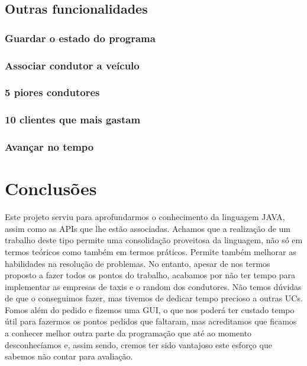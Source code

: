 \documentclass[a4paper]{article}
\begin{document}
\subsection{Outras funcionalidades}
\subsubsection{Guardar o estado do programa}
\subsubsection{Associar condutor a veículo}
\subsubsection{5 piores condutores}
\subsubsection{10 clientes que mais gastam}
\subsubsection{Avançar no tempo}


\section{Conclusões}
\label{sec:conclusao}
Este projeto serviu para aprofundarmos o conhecimento da linguagem JAVA, assim como as APIs que lhe estão associadas. Achamos que a realização de um trabalho deste tipo permite uma consolidação proveitosa da linguagem, não só em termos teóricos como também em termos práticos. Permite também melhorar as habilidades na resolução de problemas. No entanto, apesar de nos termos proposto a fazer todos os pontos do trabalho, acabamos por não ter tempo para implementar as empresas de taxis e o random dos condutores. Não temos dúvidas de que o conseguimos fazer, mas tivemos de dedicar tempo precioso a outras UCs. Fomos além do pedido e fizemos uma GUI, o que nos poderá ter custado tempo útil para fazermos os pontos pedidos que faltaram, mas acreditamos que ficamos a conhecer melhor outra parte da programação que até ao momento desconhecíamos e, assim sendo, cremos ter sido vantajoso este esforço que sabemos não contar para avaliação.
\end{document}
